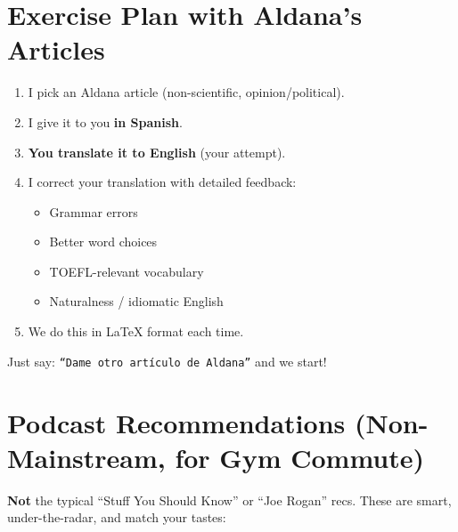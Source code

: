 \documentclass[11pt,a4paper]{article}
\begin{document}
\newpage
\section{Exercise Plan with Aldana's Articles}

\begin{tcolorbox}[colback=purple!5!white, colframe=purple!50!black, 
    title=\textbf{How We'll Work}]
\begin{enumerate}
    \item I pick an Aldana article (non-scientific, opinion/political).
    \item I give it to you \textbf{in Spanish}.
    \item \textbf{You translate it to English} (your attempt).
    \item I correct your translation with detailed feedback:
    \begin{itemize}
        \item Grammar errors
        \item Better word choices
        \item TOEFL-relevant vocabulary
        \item Naturalness / idiomatic English
    \end{itemize}
    \item We do this in \LaTeX{} format each time.
\end{enumerate}
Just say: \texttt{``Dame otro artículo de Aldana''} and we start!
\end{tcolorbox}

\newpage
\section{Podcast Recommendations (Non-Mainstream, for Gym Commute)}

\textbf{Not} the typical ``Stuff You Should Know'' or ``Joe Rogan'' recs. 
These are smart, under-the-radar, and match your tastes:
\end{document}
